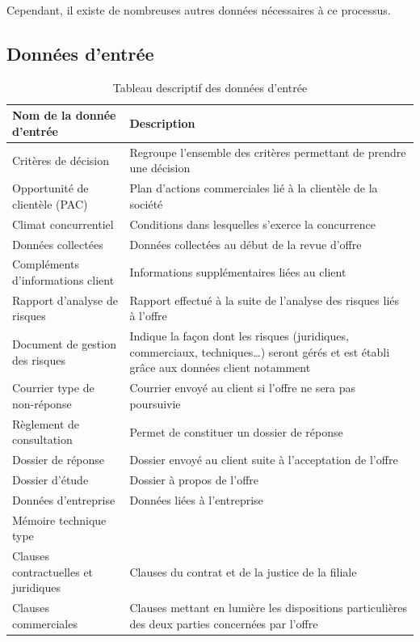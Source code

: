 Cependant, il existe de nombreuses autres données nécessaires à ce processus.

\subsection{Données d’entrée}

\begin{table}[H]
    \centering
    \caption{Tableau descriptif des données d'entrée}
    \label{tab-donnees-entree}
    \begin{tabular}{p{5.5cm}|p{10cm}}
        \bf{Nom de la donnée d’entrée} & \bf{Description} \\ \hline
        Critères de décision & Regroupe l’ensemble des critères permettant de prendre une décision \\
        Opportunité de clientèle (PAC) & Plan d’actions commerciales lié à la clientèle de la société \\
        Climat concurrentiel & Conditions dans lesquelles s’exerce la concurrence \\
        Données collectées & Données collectées au début de la revue d’offre \\
        Compléments d'informations client & Informations supplémentaires liées au client \\
        Rapport d’analyse de risques & Rapport effectué à la suite de l’analyse des risques liés à l’offre \\
        Document de gestion des risques & Indique la façon dont les risques (juridiques, commerciaux, techniques\dots) seront gérés et est établi grâce aux données client notamment \\
        Courrier type de non-réponse & Courrier envoyé au client si l’offre ne sera pas poursuivie \\
        Règlement de consultation & Permet de constituer un dossier de réponse \\
        Dossier de réponse & Dossier envoyé au client suite à l’acceptation de l’offre \\
        Dossier d’étude & Dossier à propos de l’offre \\
        Données d’entreprise & Données liées à l’entreprise \\
        Mémoire technique type & \\
        Clauses contractuelles et juridiques & Clauses du contrat et de la justice de la filiale \\
        Clauses commerciales & Clauses mettant en lumière les dispositions particulières des deux parties concernées par l’offre \\

\end{tabular}
\end{table}
